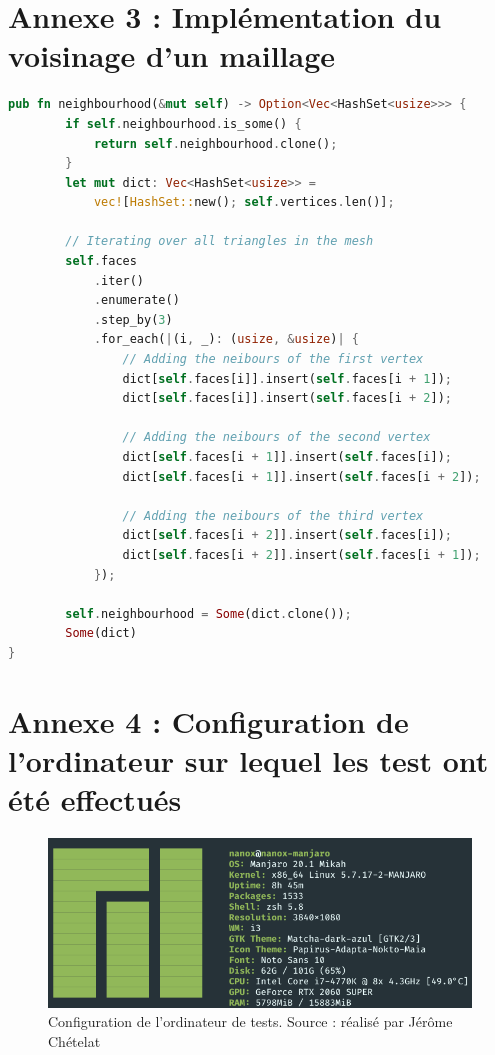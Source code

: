 \chapter*{Annexe 3 : Implémentation du voisinage d'un maillage}

\begin{lstlisting}[language=Rust, style=boxed]
pub fn neighbourhood(&mut self) -> Option<Vec<HashSet<usize>>> {
        if self.neighbourhood.is_some() {
            return self.neighbourhood.clone();
        }
        let mut dict: Vec<HashSet<usize>> = 
            vec![HashSet::new(); self.vertices.len()];

        // Iterating over all triangles in the mesh
        self.faces
            .iter()
            .enumerate()
            .step_by(3)
            .for_each(|(i, _): (usize, &usize)| {
                // Adding the neibours of the first vertex
                dict[self.faces[i]].insert(self.faces[i + 1]);
                dict[self.faces[i]].insert(self.faces[i + 2]);

                // Adding the neibours of the second vertex
                dict[self.faces[i + 1]].insert(self.faces[i]);
                dict[self.faces[i + 1]].insert(self.faces[i + 2]);

                // Adding the neibours of the third vertex
                dict[self.faces[i + 2]].insert(self.faces[i]);
                dict[self.faces[i + 2]].insert(self.faces[i + 1]);
            });

        self.neighbourhood = Some(dict.clone());
        Some(dict)
}
\end{lstlisting}

\chapter*{Annexe 4 : Configuration de l'ordinateur sur lequel les test ont été
effectués}
\begin{figure}[htbp!]
    \centering
    \includegraphics[width=0.9\linewidth]{figures/configs.png}
    \caption{Configuration de l'ordinateur de tests. Source : réalisé par Jérôme Chételat}
	\label{fig:computer_configuration}
\end{figure}

